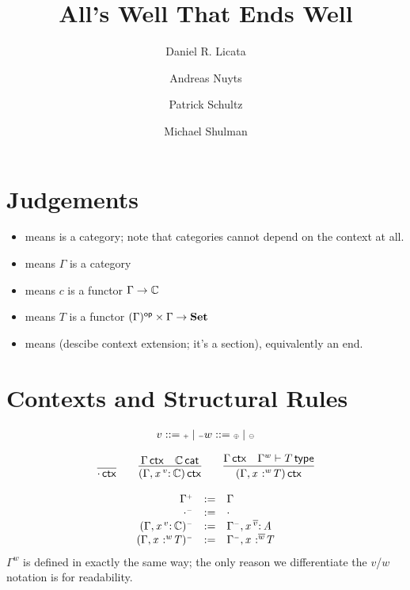 \documentclass[11pt]{article}
\title{All's Well That Ends Well}
\author{Daniel R. Licata \and Andreas Nuyts \and Patrick Schultz \and Michael Shulman}
\theoremstyle{plain}
\begin{document}
\maketitle

\section{Judgements}

\begin{itemize}

\item \wfdtp{\C} means \C\/ is a category; note that categories cannot
  depend on the context at all.  

\item \wfctx{\G} means $\Gamma$ is a category

\item {} means $c$ is a functor
  ${\Gamma} \to \mathbb{C}$

\item {} means $T$ is a functor
  $(\Gamma)^{\mathsf{op}} \times \Gamma \to \mathbf{Set}$

\item {} means (descibe context extension; it's a
  section), equivalently an end.  

\end{itemize}

\section{Contexts and Structural Rules}

\[
\begin{array}{l}
v ::= {\text{\tiny $\mathord{+}$}} \mid {\text{\tiny $\mathord{-}$}}
w ::= {\text{\tiny $\mathord{\oplus}$}} \mid {\text{\tiny $\mathord{\ominus}$}}
\end{array}
\]

\[
\begin{array}{c}
\infer{\wfctx{\cdot}}{} 
\qquad
\infer{\wfctx{(\Gamma,\vtptm{x}{v}{\C})}}
      {\wfctx{\Gamma} & 
       \wfdtp{\C}
      } 
\qquad
\infer{\wfctx{(\Gamma,\tptmv{x}{w}{T})}}
      {\wfctx{\Gamma} & 
        \wftp{\Gamma^w}{T}
      } 
\end{array}
\]

\[
\begin{array}{rcl}
\Gamma^{{\text{\tiny $\mathord{+}$}}} & := & \Gamma \\
\cdot^{{\text{\tiny $\mathord{-}$}}} & := & \cdot \\
({\Gamma},\mathit{x} \,^{v}{:}^{\,} \mathit{\mathbb{C}})^{{\text{\tiny $\mathord{-}$}}} & := & {\Gamma^{{\text{\tiny $\mathord{-}$}}}},\mathit{x} \,^{\overline{v}}{:}^{\,} \mathit{A} \\
({\Gamma},\mathit{x} \,^{\,}{:}^{w} \mathit{T})^{{\text{\tiny $\mathord{-}$}}} & := & {\Gamma^{{\text{\tiny $\mathord{-}$}}}},\mathit{x} \,^{\,}{:}^{\overline{w}} \mathit{T} \\
\end{array}
\]
$\Gamma^w$ is defined in exactly the same way; the only reason we
differentiate the $v$/$w$ notation is for readability.  
\end{document}
